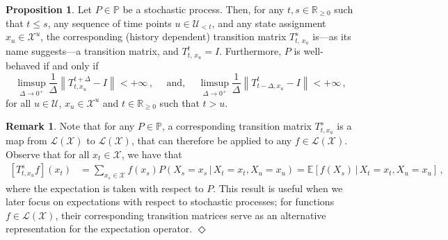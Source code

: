 \documentclass[10pt,a4paper]{paper}
\theoremstyle{definition}
\newtheorem{proposition}[theorem]{Proposition}
\newtheorem{remark}{Remark}
\newcommand{\reals}{\mathbb{R}}
\newcommand{\realsnonneg}{\reals_{\geq 0}}
\newcommand{\states}{\mathcal{X}}
\newcommand{\processes}{\mathbb{P}}
\newcommand{\gambles}{\mathcal{L}}
\newcommand{\gamblesX}{\gambles(\states)}
\newcommand{\norm}[1]{\left\lVert #1 \right\rVert}
\newcommand{\exampleend}{\hfill$\Diamond$}
\begin{document}
\begin{proposition}\label{prop:stochasticprocess:simpleproperties}
Let $P\in\processes$ be a stochastic process.  %
Then, for any $t,s\in\realsnonneg$ such that $t\leq s$, any sequence of time points $u\in\mathcal{U}_{<t}$, and any state assignment $x_u\in\states^u$, the corresponding (history dependent) transition matrix $T_{t,\,x_u}^s$ is---as its name suggests---a transition matrix, and $T_{t,\,x_u}^t=I$. Furthermore, $P$ is well-behaved if and only if
\begin{equation}\label{eq:wellbehavedtransitionmatrix}%
\limsup_{\Delta\to 0^{+}}\frac{1}{\Delta}\norm{T_{t,x_u}^{t+\Delta}-I}<+\infty\,,
\text{~~~~and,~~~~}
\limsup_{\Delta\to 0^{+}}\frac{1}{\Delta}\norm{T_{t-\Delta,x_u}^t-I}<+\infty\,,
\end{equation}
for all $u\in\mathcal{U}$, $x_u\in\states^u$ and $t\in\reals_{\geq0}$ such that $t>u$.
\end{proposition}

\begin{remark}\label{remark:expectationT}
Note that for any $P\in\processes$, a corresponding transition matrix $T_{t, x_u}^s$ is a map from $\gamblesX$ to $\gamblesX$, that can therefore be applied to any $f\in\gamblesX$. Observe that for all $x_t\in\states$, we have that
\begin{align*}
\left[T_{t,x_u}^sf\right](x_t) &= \sum_{x_s\in\states}f(x_s)P(X_s=x_s\,\vert\,X_t=x_t,X_u=x_u)= \mathbb{E}\left[f(X_s)\,\vert\,X_t=x_t, X_u=x_u\right]\,,
\end{align*}
where the expectation is taken with respect to $P$. This result is useful when we later focus on expectations with respect to stochastic processes; for functions $f\in\gamblesX$, their corresponding transition matrices serve as an alternative representation for the expectation operator.  %
\exampleend
\end{remark}
\end{document}
